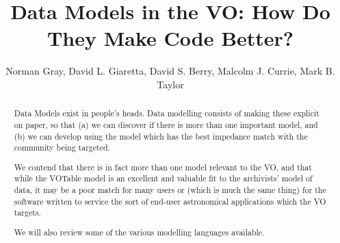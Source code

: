 \documentclass[11pt,twoside]{article}
\begin{document}

\title{Data Models in the VO: How Do They Make Code Better?}
\marginpar{[v\RCSRevision]}%

\author{Norman Gray,
        David L. Giaretta,
        David S. Berry,
        Malcolm J. Currie,
        Mark B. Taylor}









\begin{abstract}
Data Models exist in people's heads.  Data modelling consists of making
these explicit on paper, so that (a) we can discover if there is more
than one important model, and (b) we can develop using the model which
has the best impedance match with the community being targeted.

We contend that there is in fact more than one model relevant to the
VO, and that while the VOTable model is an excellent and valuable fit
to the archivists' model of data, it may be a poor match for many
users or (which is much the same thing) for the software written to
service the sort of end-user astronomical applications which the VO
targets.

We will also review some of the various modelling languages available.
\end{abstract}
\end{document}
